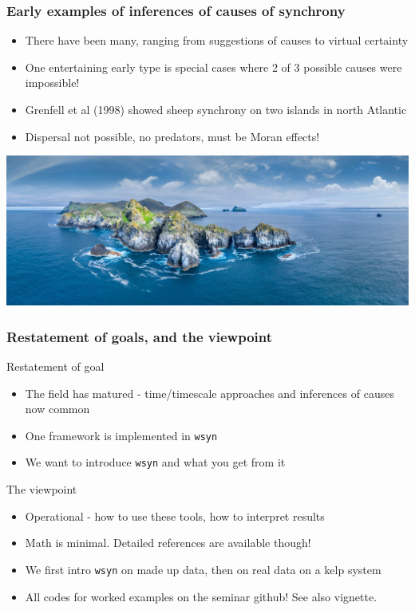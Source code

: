 \documentclass{beamer}
\begin{document}
\begin{frame}
\frametitle{Early examples of inferences of causes of synchrony}
\begin{itemize}
\item There have been many, ranging from suggestions of causes to virtual certainty
\item One entertaining early type is special cases where 2 of 3 possible causes were impossible!
\item Grenfell et al (1998) showed sheep synchrony on two islands in north Atlantic
\item Dispersal not possible, no predators, must be Moran effects!
\end{itemize}
\includegraphics[width=\textwidth]{figures/StKilda.jpg}
\end{frame}

\begin{frame}
\frametitle{Restatement of goals, and the viewpoint}
\begin{block}{Restatement of goal}
\begin{itemize}
\item The field has matured - time/timescale approaches and inferences of causes now common
\item One framework is implemented in \texttt{wsyn}
\item We want to introduce \texttt{wsyn} and what you get from it
\end{itemize}
\end{block}
\begin{block}{The viewpoint}
\begin{itemize}
\item Operational - how to use these tools, how to interpret results
\item Math is minimal. Detailed references are available though!
\item We first intro \texttt{wsyn} on made up data, then on real data on a kelp system
\item All codes for worked examples on the seminar github! See also vignette.
\end{itemize}
\end{block}
\end{frame}
\end{document}

